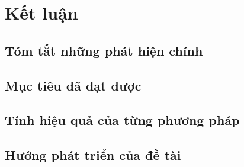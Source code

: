 \chapter{Kết luận}

\section{Tóm tắt những phát hiện chính}

\section{Mục tiêu đã đạt được}

\section{Tính hiệu quả của từng phương pháp}

\section{Hướng phát triển của đề tài}